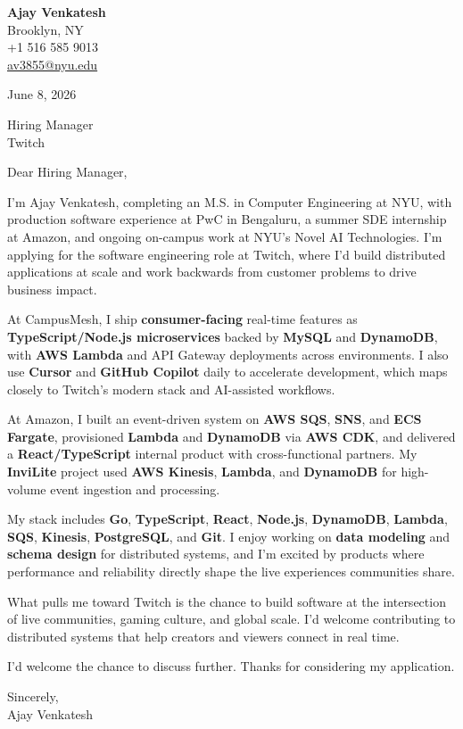 \documentclass[letterpaper,11pt]{article}
\begin{document}
\begin{flushleft}
\textbf{\large Ajay Venkatesh} \\
Brooklyn, NY \\
+1 516 585 9013 \\
\href{mailto:av3855@nyu.edu}{av3855@nyu.edu}
\end{flushleft}
\vspace{10pt}
June 8, 2026
\vspace{6pt}

Hiring Manager \\
Twitch

\vspace{10pt}

Dear Hiring Manager,

I'm Ajay Venkatesh, completing an M.S. in Computer Engineering at NYU, with production software experience at PwC in Bengaluru, a summer SDE internship at Amazon, and ongoing on-campus work at NYU's Novel AI Technologies. I'm applying for the software engineering role at Twitch, where I'd build distributed applications at scale and work backwards from customer problems to drive business impact.

At CampusMesh, I ship \textbf{consumer-facing} real-time features as \textbf{TypeScript/Node.js microservices} backed by \textbf{MySQL} and \textbf{DynamoDB}, with \textbf{AWS Lambda} and API Gateway deployments across environments. I also use \textbf{Cursor} and \textbf{GitHub Copilot} daily to accelerate development, which maps closely to Twitch's modern stack and AI-assisted workflows.

At Amazon, I built an event-driven system on \textbf{AWS SQS}, \textbf{SNS}, and \textbf{ECS Fargate}, provisioned \textbf{Lambda} and \textbf{DynamoDB} via \textbf{AWS CDK}, and delivered a \textbf{React/TypeScript} internal product with cross-functional partners. My \textbf{InviLite} project used \textbf{AWS Kinesis}, \textbf{Lambda}, and \textbf{DynamoDB} for high-volume event ingestion and processing.

My stack includes \textbf{Go}, \textbf{TypeScript}, \textbf{React}, \textbf{Node.js}, \textbf{DynamoDB}, \textbf{Lambda}, \textbf{SQS}, \textbf{Kinesis}, \textbf{PostgreSQL}, and \textbf{Git}. I enjoy working on \textbf{data modeling} and \textbf{schema design} for distributed systems, and I'm excited by products where performance and reliability directly shape the live experiences communities share.

What pulls me toward Twitch is the chance to build software at the intersection of live communities, gaming culture, and global scale. I'd welcome contributing to distributed systems that help creators and viewers connect in real time.

I'd welcome the chance to discuss further. Thanks for considering my application.

\vspace{12pt}
Sincerely, \\
Ajay Venkatesh
\end{document}
